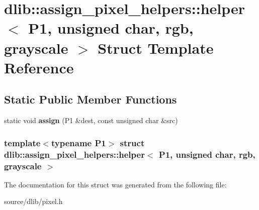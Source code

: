 \hypertarget{structdlib_1_1assign__pixel__helpers_1_1helper_3_01P1_00_01unsigned_01char_00_01rgb_00_01grayscale_01_4}{
\section{dlib::assign\_\-pixel\_\-helpers::helper$<$ P1, unsigned char, rgb, grayscale $>$ Struct Template Reference}
\label{structdlib_1_1assign__pixel__helpers_1_1helper_3_01P1_00_01unsigned_01char_00_01rgb_00_01grayscale_01_4}
}
\subsection*{Static Public Member Functions}
\begin{DoxyCompactItemize}
\item 
\hypertarget{structdlib_1_1assign__pixel__helpers_1_1helper_3_01P1_00_01unsigned_01char_00_01rgb_00_01grayscale_01_4_ad1b5e22580cc70d6132b205552327703}{
static void {\bfseries assign} (P1 \&dest, const unsigned char \&src)}
\label{structdlib_1_1assign__pixel__helpers_1_1helper_3_01P1_00_01unsigned_01char_00_01rgb_00_01grayscale_01_4_ad1b5e22580cc70d6132b205552327703}

\end{DoxyCompactItemize}
\subsubsection*{template$<$typename P1$>$ struct dlib::assign\_\-pixel\_\-helpers::helper$<$ P1, unsigned char, rgb, grayscale $>$}



The documentation for this struct was generated from the following file:\begin{DoxyCompactItemize}
\item 
source/dlib/pixel.h\end{DoxyCompactItemize}
